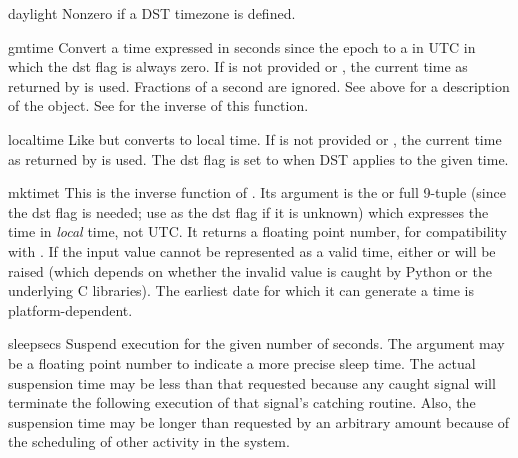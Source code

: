 \begin{datadesc}{daylight}
Nonzero if a DST timezone is defined.
\end{datadesc}

\begin{funcdesc}{gmtime}{}
Convert a time expressed in seconds since the epoch to a 
in UTC in which the dst flag is always zero.  If  is not
provided or , the current time as returned by
 is used.  Fractions of a second are ignored.  See
above for a description of the  object. See
 for the inverse of this function.
\end{funcdesc}

\begin{funcdesc}{localtime}{}
Like  but converts to local time.  If  is
not provided or , the current time as returned by
 is used.  The dst flag is set to  when DST
applies to the given time.
\end{funcdesc}

\begin{funcdesc}{mktime}{t}
This is the inverse function of .  Its argument
is the  or full 9-tuple (since the dst flag is
needed; use  as the dst flag if it is unknown) which
expresses the time in
\emph{local} time, not UTC.  It returns a floating point number, for
compatibility with .  If the input value cannot be
represented as a valid time, either  or
 will be raised (which depends on whether the
invalid value is caught by Python or the underlying C libraries).  The
earliest date for which it can generate a time is platform-dependent.
\end{funcdesc}

\begin{funcdesc}{sleep}{secs}
Suspend execution for the given number of seconds.  The argument may
be a floating point number to indicate a more precise sleep time.
The actual suspension time may be less than that requested because any
caught signal will terminate the  following
execution of that signal's catching routine.  Also, the suspension
time may be longer than requested by an arbitrary amount because of
the scheduling of other activity in the system.
\end{funcdesc}

